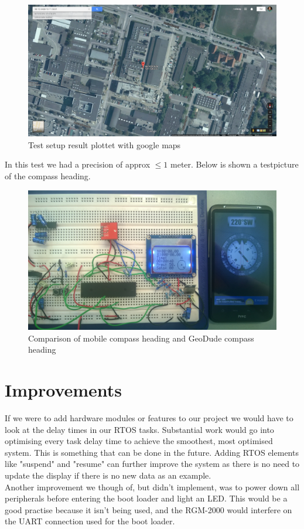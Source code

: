 \begin{figure}[H]
\centering
\includegraphics[width=.9\textwidth]{billeder/coordinate_map}
\caption{Test setup result plottet with google maps}
\end{figure}

In this test we had a precision of approx $\leq1$ meter.
Below is shown a testpicture of the compass heading.
\begin{figure}[H]
\centering
\includegraphics[width=.9\textwidth]{billeder/compas}
\caption{Comparison of mobile compass heading and GeoDude compass heading}
\end{figure}
\chapter{Improvements}
If we were to add hardware modules or features to our project we would have to look at the delay times in our RTOS tasks. Substantial work would go into optimising every task delay time to achieve the smoothest, most optimised system. This is something that can be done in the future. Adding RTOS elements like "suspend" and "resume" can further improve the system as there is no need to update the display if there is no new data as an example. \\
Another improvement we though of, but didn't implement, was to power down all peripherals before entering the boot loader and light an LED. This would be a good practise because it isn't being used, and the RGM-2000 would interfere on the UART connection used for the boot loader.

